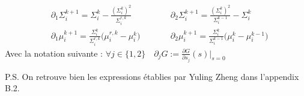 \documentclass[12pt]{article}
\begin{document}
\begin{propositionbox}
\label{prop:deriv1}
\begin{equation}
\begin{aligned}
&\partial_1 \Sigma_i^{k+1} = \Sigma_i^k - \frac{(\Sigma_i^k)^2}{\Sigma_i^{r,k}} \qquad
&&\partial_2 \Sigma_i^{k+1} = \frac{(\Sigma_i^k)^2}{\Sigma_i^{k-1}} - \Sigma_i^k\\[6pt]
&\partial_1 \mu_i^{k+1} = \frac{\Sigma_i^k}{\Sigma_i^{r,k}} \bigl( \mu_i^{r,k} - \mu_i^k \bigr) \qquad
&&\partial_2 \mu_i^{k+1} = \frac{\Sigma_i^k}{\Sigma_i^{k-1}} \bigl( \mu_i^k - \mu_i^{k-1} \bigr)
\end{aligned}
\end{equation}
Avec la notation suivante : \( \forall j \in \{1,2\} \quad \partial_j G := \frac{\partial G}{\partial s_j}(s)\Big|_{s=0} \)

P.S. On retrouve bien les expressions établies par Yuling Zheng dans l'appendix B.2.
\end{propositionbox}
\end{document}
